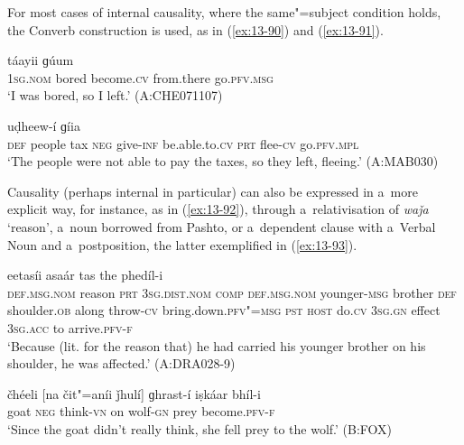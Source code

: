 For most cases of internal causality, where the same"=subject condition holds, the Converb construction is used, as in (\ref{ex:13-90}) and (\ref{ex:13-91}).

\begin{exe}
\ex
\label{ex:13-90}
 táayii ɡúum  \\
\textsc{1sg.nom} bored become.\textsc{cv} from.there go.\textsc{pfv.msg}  \\
\glt `I was bored, so I left.' (A:CHE071107)

\ex
\label{ex:13-91}
 uḍheew-í ɡíia \\
 \textsc{def} people tax \textsc{neg} give-\textsc{inf} be.able.to.\textsc{cv} \textsc{prt}  flee-\textsc{cv}  go.\textsc{pfv.mpl}   \\
\glt `The people were not able to pay the taxes, so they left, fleeing.' (A:MAB030) 
\end{exe}

Causality (perhaps internal in particular) can also be expressed in a~more explicit way, for instance, as in (\ref{ex:13-92}), through a~relativisation of \textit{waǰa} `reason', a~noun borrowed from Pashto, or a~dependent clause with a~Verbal Noun and a~postposition, the latter exemplified in (\ref{ex:13-93}).

\begin{exe}
\ex
\label{ex:13-92}
 eetasíi asaár tas the phedíl-i \\
\textsc{def.msg.nom} reason \textsc{prt} \textsc{3sg.dist.nom} \textsc{comp} \textsc{def.msg.nom} younger-\textsc{msg} brother \textsc{def}{\protect\footnotemark} shoulder.\textsc{ob} along throw-\textsc{cv} bring.down.\textsc{pfv"=msg} \textsc{pst} \textsc{host} do.\textsc{cv}  \textsc{3sg.gn} effect \textsc{3sg.acc} to arrive.\textsc{pfv-f} \\
\glt `Because (lit. for the reason that) he had carried his younger brother on his shoulder, he was affected.' (A:DRA028-9)

\ex
\label{ex:13-93}
\gll čhéeli [na čit"=aníi ǰhulí] ɡhrast-í iṣkáar bhíl-i \\
goat \textsc{neg} think-\textsc{vn} on wolf-\textsc{gn} prey become.\textsc{pfv-f}  \\
\glt `Since the goat didn't really think, she fell prey to the wolf.' (B:FOX)
\end{exe}


